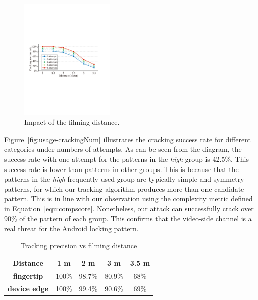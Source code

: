         \begin{figure}[t!]
            \centering
            \vspace{-3mm}
            \includegraphics[width=0.4\textwidth]{fig/12.pdf}
            \vspace{-3mm}
            \caption{Impact of the filming distance.}
            \label{fig:fig12}
            \vspace{-4mm}
        \end{figure}

            Figure~\ref{fig:usage-crackingNum} illustrates the cracking success rate for different categories under
            numbers of attempts.  As can be seen from the diagram, the success rate with one attempt for the patterns
            in the \emph{high} group is 42.5\%. This success rate is lower than patterns in other groups. This is because that
            the patterns in the \emph{high} frequently used group are typically simple and symmetry patterns, for which our tracking algorithm produces more
            than one candidate pattern. This is in line with our observation using the complexity metric defined in
            Equation~\ref{equ:compscore}. Nonetheless, our attack can successfully crack over 90\% of the pattern of
            each group. This confirms that the video-side channel is a real threat for the Android locking pattern.

        \begin{table}[!t]
            \centering
            \caption{Tracking precision vs filming distance}
            \vspace{-2mm}
            \label{tab:tab1}
            \small
            \begin{tabular}{ccccc}
                \toprule
                \textbf{Distance}& 1 m & 2 m & 3 m & 3.5 m \\
                \midrule
                \textbf{fingertip}  & 100\% & 98.7\% & 80.9\% & 68\% \\
                \textbf{device edge} & 100\% & 99.4\% & 90.6\% & 69\% \\
                \bottomrule
            \end{tabular}
            \vspace{-4mm}
        \end{table}

